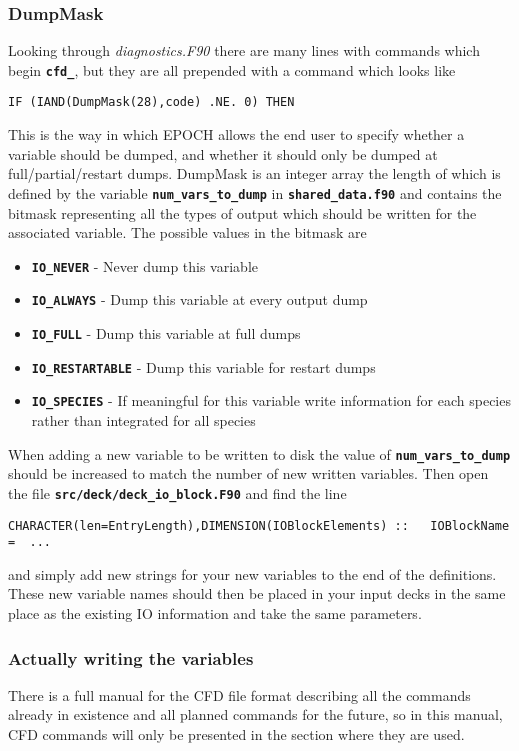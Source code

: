\documentclass[12pt]{article}
\newcommand{\simpleboxverbatim}{\begin{Verbatim}[obeytabs=true,frame=single,
  framerule=0.5mm,rulecolor=\color{warwickmid}]}
\newcommand{\inlinecode}[1]{{\color{warwickred} \bf\texttt{#1}}}
\newcommand{\nEPOCH}{{\color{warwickdark}\fontfamily{phv}\selectfont EPOCH}}
\newcommand{\EPOCH}{{\nEPOCH} }
\begin{document}
\subsubsection{DumpMask}
Looking through {\it diagnostics.F90} there are many lines with commands which
begin \inlinecode{cfd\_}, but they are all prepended with a command which looks
like
\simpleboxverbatim
     IF (IAND(DumpMask(28),code) .NE. 0) THEN
\end{Verbatim}
This is the way in which \EPOCH allows the end user to specify whether a
variable should be dumped, and whether it should only be dumped at
full/partial/restart dumps. DumpMask is an integer array the length of which is
defined by the variable \inlinecode{num\_vars\_to\_dump} in
\inlinecode{shared\_data.f90} and contains the bitmask representing all the
types of output which should be written for the associated variable. The
possible values in the bitmask are

\begin{itemize}
\item \inlinecode{IO\_NEVER} - Never dump this variable
\item \inlinecode{IO\_ALWAYS} - Dump this variable at every output dump
\item \inlinecode{IO\_FULL} - Dump this variable at full dumps
\item \inlinecode{IO\_RESTARTABLE} - Dump this variable for restart dumps
\item \inlinecode{IO\_SPECIES} - If meaningful for this variable write
  information for each species rather than integrated for all species
\end{itemize}

When adding a new variable to be written to disk the value of
\inlinecode{num\_vars\_to\_dump} should be increased to match the number of new
written variables. Then open the file \inlinecode{src/deck/deck\_io\_block.F90}
and find the line
\simpleboxverbatim
  CHARACTER(len=EntryLength),DIMENSION(IOBlockElements) ::   IOBlockName =  ...
\end{Verbatim}

and simply add new strings for your new variables to the end of the
definitions. These new variable names should then be placed in your input decks
in the same place as the existing IO information and take the same parameters.

\subsubsection{Actually writing the variables}
There is a full manual for the CFD file format describing all the commands
already in existence and all planned commands for the future, so in this
manual, CFD commands will only be presented in the section where they are used.
\end{document}
